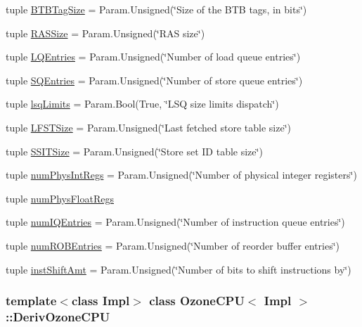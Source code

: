 \begin{DoxyCompactItemize}
tuple \hyperlink{classOzoneCPU_1_1DerivOzoneCPU_ad8cca86a44213bc6d3bd04b3447079d8}{BTBTagSize} = Param.Unsigned(\char`\"{}Size of the BTB tags, in bits\char`\"{})
\item 
tuple \hyperlink{classOzoneCPU_1_1DerivOzoneCPU_ad32cfe43a618dca49f7aba3c597df196}{RASSize} = Param.Unsigned(\char`\"{}RAS size\char`\"{})
\item 
tuple \hyperlink{classOzoneCPU_1_1DerivOzoneCPU_ae14ed73e842c3580d021c73c0e2b5aaf}{LQEntries} = Param.Unsigned(\char`\"{}Number of load queue entries\char`\"{})
\item 
tuple \hyperlink{classOzoneCPU_1_1DerivOzoneCPU_a910857438278a89a287832cf7087317b}{SQEntries} = Param.Unsigned(\char`\"{}Number of store queue entries\char`\"{})
\item 
tuple \hyperlink{classOzoneCPU_1_1DerivOzoneCPU_a817ec7e355e3f6da8580c48725c85632}{lsqLimits} = Param.Bool(True, \char`\"{}LSQ size limits dispatch\char`\"{})
\item 
tuple \hyperlink{classOzoneCPU_1_1DerivOzoneCPU_ae8cdf1f1e20a08d0b3200297a9da7d60}{LFSTSize} = Param.Unsigned(\char`\"{}Last fetched store table size\char`\"{})
\item 
tuple \hyperlink{classOzoneCPU_1_1DerivOzoneCPU_aaae81435109fd5abd8db9e1cac852536}{SSITSize} = Param.Unsigned(\char`\"{}Store set ID table size\char`\"{})
\item 
tuple \hyperlink{classOzoneCPU_1_1DerivOzoneCPU_a4872233fcf1f251c1065c07bf3d288b4}{numPhysIntRegs} = Param.Unsigned(\char`\"{}Number of physical integer registers\char`\"{})
\item 
tuple \hyperlink{classOzoneCPU_1_1DerivOzoneCPU_aa014e3ffbc9e5c2cdee9cd256bcb9a94}{numPhysFloatRegs}
\item 
tuple \hyperlink{classOzoneCPU_1_1DerivOzoneCPU_a008b4cba2a3f283c5889144437338721}{numIQEntries} = Param.Unsigned(\char`\"{}Number of instruction queue entries\char`\"{})
\item 
tuple \hyperlink{classOzoneCPU_1_1DerivOzoneCPU_acb1025bcc322542b7e2fc418cd8d4308}{numROBEntries} = Param.Unsigned(\char`\"{}Number of reorder buffer entries\char`\"{})
\item 
tuple \hyperlink{classOzoneCPU_1_1DerivOzoneCPU_a04bfc27685a42245093252b2fab219a5}{instShiftAmt} = Param.Unsigned(\char`\"{}Number of bits to shift instructions by\char`\"{})
\end{DoxyCompactItemize}
\subsubsection*{template$<$class Impl$>$ class OzoneCPU$<$ Impl $>$::DerivOzoneCPU}



